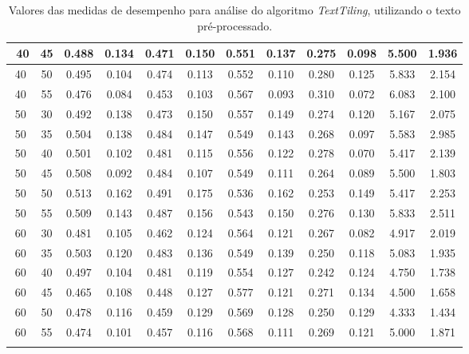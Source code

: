 \begin{longtable}[c]{|c|c|c|c|c|c|c|c|c|c|c|c|}
$$  40 & 45 & 0.488 & 0.134 & 0.471 & 0.150 & 0.551 & 0.137 & 0.275 & 0.098 & 5.500 & 1.936  \\ \hline 
  40 & 50 & 0.495 & 0.104 & 0.474 & 0.113 & 0.552 & 0.110 & 0.280 & 0.125 & 5.833 & 2.154  \\ \hline 
  40 & 55 & 0.476 & 0.084 & 0.453 & 0.103 & 0.567 & 0.093 & 0.310 & 0.072 & 6.083 & 2.100  \\ \hline 
  50 & 30 & 0.492 & 0.138 & 0.473 & 0.150 & 0.557 & 0.149 & 0.274 & 0.120 & 5.167 & 2.075  \\ \hline 
  50 & 35 & 0.504 & 0.138 & 0.484 & 0.147 & 0.549 & 0.143 & 0.268 & 0.097 & 5.583 & 2.985  \\ \hline 
  50 & 40 & 0.501 & 0.102 & 0.481 & 0.115 & 0.556 & 0.122 & 0.278 & 0.070 & 5.417 & 2.139  \\ \hline 
  50 & 45 & 0.508 & 0.092 & 0.484 & 0.107 & 0.549 & 0.111 & 0.264 & 0.089 & 5.500 & 1.803  \\ \hline 
  50 & 50 & 0.513 & 0.162 & 0.491 & 0.175 & 0.536 & 0.162 & 0.253 & 0.149 & 5.417 & 2.253  \\ \hline 
  50 & 55 & 0.509 & 0.143 & 0.487 & 0.156 & 0.543 & 0.150 & 0.276 & 0.130 & 5.833 & 2.511  \\ \hline 
  60 & 30 & 0.481 & 0.105 & 0.462 & 0.124 & 0.564 & 0.121 & 0.267 & 0.082 & 4.917 & 2.019  \\ \hline 
  60 & 35 & 0.503 & 0.120 & 0.483 & 0.136 & 0.549 & 0.139 & 0.250 & 0.118 & 5.083 & 1.935  \\ \hline 
  60 & 40 & 0.497 & 0.104 & 0.481 & 0.119 & 0.554 & 0.127 & 0.242 & 0.124 & 4.750 & 1.738  \\ \hline 
  60 & 45 & 0.465 & 0.108 & 0.448 & 0.127 & 0.577 & 0.121 & 0.271 & 0.134 & 4.500 & 1.658  \\ \hline 
  60 & 50 & 0.478 & 0.116 & 0.459 & 0.129 & 0.569 & 0.128 & 0.250 & 0.129 & 4.333 & 1.434  \\ \hline 
  60 & 55 & 0.474 & 0.101 & 0.457 & 0.116 & 0.568 & 0.111 & 0.269 & 0.121 & 5.000 & 1.871  \\ \hline 
 \caption{Valores das medidas de desempenho para análise do algoritmo \textit{TextTiling}, utilizando o texto pré-processado.}
 \end{longtable} 


